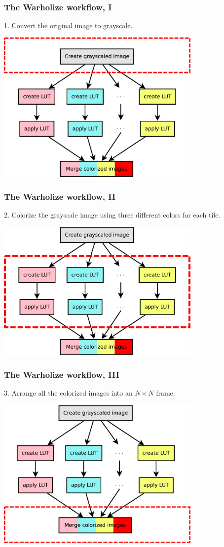 \documentclass[english,serif,mathserif,usenames,dvipsnames]{beamer}
\begin{document}
\begin{frame}
  \frametitle{The Warholize workflow, I}

  1. Convert the original image to grayscale.

  \+
  \includegraphics[width=0.75\textwidth]{fig/warholize-wkf1}
\end{frame}


\begin{frame}
  \frametitle{The Warholize workflow, II}

  2. Colorize the grayscale image using three different colors for each tile.

  \+
  \includegraphics[width=0.75\textwidth]{fig/warholize-wkf2}
\end{frame}


\begin{frame}
  \frametitle{The Warholize workflow, III}

  3. Arrange all the colorized images into an $N\times N$ frame.

  \+
  \includegraphics[width=0.75\textwidth]{fig/warholize-wkf3}
\end{frame}
\end{document}
